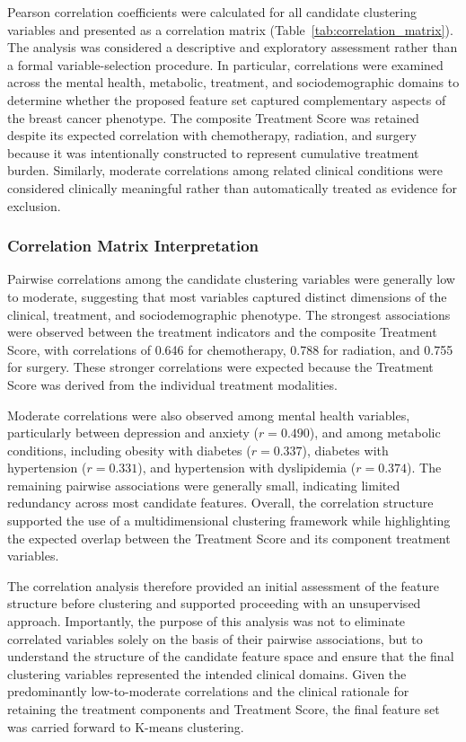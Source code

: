 \documentclass[11pt]{article}
\begin{document}
Pearson correlation coefficients were calculated for all candidate clustering variables and presented as a correlation matrix (Table~\ref{tab:correlation_matrix}). The analysis was considered a descriptive and exploratory assessment rather than a formal variable-selection procedure. In particular, correlations were examined across the mental health, metabolic, treatment, and sociodemographic domains to determine whether the proposed feature set captured complementary aspects of the breast cancer phenotype. The composite Treatment Score was retained despite its expected correlation with chemotherapy, radiation, and surgery because it was intentionally constructed to represent cumulative treatment burden. Similarly, moderate correlations among related clinical conditions were considered clinically meaningful rather than automatically treated as evidence for exclusion.



\subsubsection{Correlation Matrix Interpretation}

Pairwise correlations among the candidate clustering variables were generally low to moderate, suggesting that most variables captured distinct dimensions of the clinical, treatment, and sociodemographic phenotype. The strongest associations were observed between the treatment indicators and the composite Treatment Score, with correlations of 0.646 for chemotherapy, 0.788 for radiation, and 0.755 for surgery. These stronger correlations were expected because the Treatment Score was derived from the individual treatment modalities.

Moderate correlations were also observed among mental health variables, particularly between depression and anxiety ($r=0.490$), and among metabolic conditions, including obesity with diabetes ($r=0.337$), diabetes with hypertension ($r=0.331$), and hypertension with dyslipidemia ($r=0.374$). The remaining pairwise associations were generally small, indicating limited redundancy across most candidate features. Overall, the correlation structure supported the use of a multidimensional clustering framework while highlighting the expected overlap between the Treatment Score and its component treatment variables.


The correlation analysis therefore provided an initial assessment of the feature structure before clustering and supported proceeding with an unsupervised approach. Importantly, the purpose of this analysis was not to eliminate correlated variables solely on the basis of their pairwise associations, but to understand the structure of the candidate feature space and ensure that the final clustering variables represented the intended clinical domains. Given the predominantly low-to-moderate correlations and the clinical rationale for retaining the treatment components and Treatment Score, the final feature set was carried forward to K-means clustering.
\end{document}
